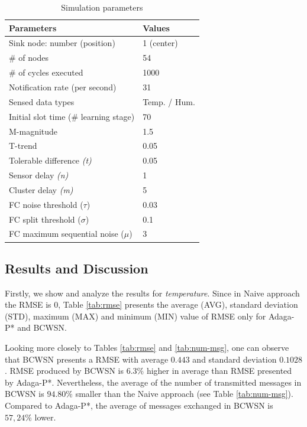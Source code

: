 \documentclass{acm_proc_article-sp}
\begin{document}
\begin{table}[h!]
\tiny 
\caption{Simulation parameters}
\label{tab:parameters}
\begin{center}
\begin{tabular}{|l||l|}
\hline
Parameters &Values\\
\hline\hline
Sink node: number (position) &1 (center) \\
\hline
\# of nodes &54 \\
\hline
\# of cycles executed &1000 \\
\hline
Notification rate (per second) &31 \\
\hline
Sensed data types &Temp. / Hum. \\
\hline
Initial slot time (\# learning stage) &70 \\
\hline
M-magnitude &1.5 \\
\hline
T-trend &0.05 \\
\hline
Tolerable difference {\it(t)} &0.05 \\
\hline
Sensor delay {\it(n)} &1 \\
\hline
Cluster delay {\it(m)} &5 \\
\hline
FC noise threshold ($\tau$) &0.03 \\
\hline
FC split threshold ($\sigma$) &0.1 \\
\hline
FC maximum sequential noise ($\mu$) &3 \\
\hline
\end{tabular}
\end{center}
\end{table}
\vspace*{-.3cm}


\subsection{Results and Discussion}
\label{results-and-discussion}

Firstly, we show and analyze the results for {\it temperature}. Since in Naive
approach the RMSE is $0$, Table \ref{tab:rmse} presents the average (AVG),
standard deviation (STD), maximum (MAX) and minimum (MIN) value of RMSE only for
Adaga-P* and BCWSN.
\vspace*{-.3cm}

Looking more closely to Tables \ref{tab:rmse} and \ref{tab:num-msg}, one can
observe that BCWSN presents a RMSE with average $0.443$ and standard deviation
$0.1028$. RMSE produced by BCWSN is $6.3\%$ higher in average than RMSE
presented by Adaga-P*. Nevertheless, the average of the number of transmitted
messages in BCWSN is $94.80\%$ smaller than the Naive approach (see Table
\ref{tab:num-msg}). Compared to Adaga-P*, the average of messages exchanged in
BCWSN is $57,24\%$ lower.
\vspace*{-.3cm}
\end{document}
